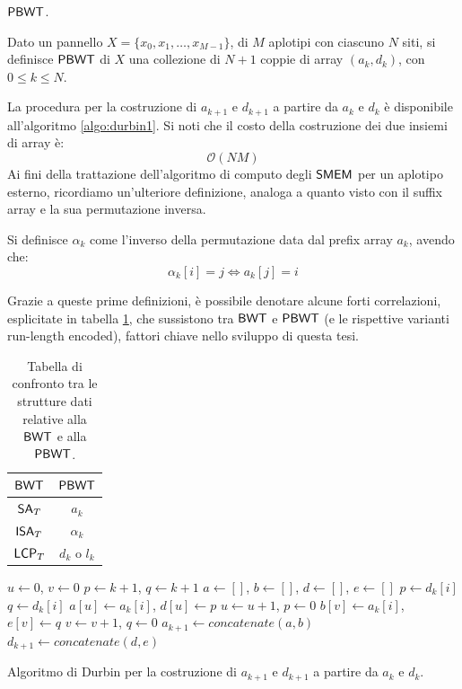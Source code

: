 $\mbox{\rm {\sf PBWT}}$.
\begin{definizione}
  Dato un pannello $X=\{x_0,x_1,\ldots,x_{M-1}\}$, di $M$ aplotipi con ciascuno
  $N$ siti, si definisce $\mbox{\rm {\sf PBWT}}$ di $X$ una
  collezione di $N+1$ coppie di array $(a_k,d_k)$, con $0\leq k\leq N$.
\end{definizione}
La procedura per la costruzione di $a_{k+1}$ e $d_{k+1}$ a partire da $a_k$ e
$d_k$ è disponibile all'algoritmo \ref{algo:durbin1}. Si noti che
il costo della costruzione dei due insiemi di array è:
\begin{equation}
  \label{eq:pbwtadtime}
  \mathcal{O}(\mathit{NM})
\end{equation}
Ai fini della trattazione dell'algoritmo di computo degli $\mbox{\rm {\sf SMEM}}$ per
un aplotipo esterno,
ricordiamo un'ulteriore definizione, analoga
a quanto visto con il suffix array e la sua permutazione inversa. 
\begin{definizione}
  Si definisce $\alpha_k$ come l'inverso della permutazione data dal
  prefix array $a_k$, avendo che:
  \[\alpha_k[i]=j \iff a_k[j]=i\]
\end{definizione}
Grazie a queste prime definizioni, è possibile denotare alcune forti
correlazioni, esplicitate in tabella \ref{tab:pbwtbwt}, che sussistono tra 
$\mbox{\rm {\sf BWT}}$ e $\mbox{\rm {\sf PBWT}}$ (e le rispettive varianti run-length
encoded), fattori chiave nello sviluppo di
questa tesi.
\begin{table}
  \centering
  \caption{Tabella di confronto tra le strutture dati relative alla $\mbox{\rm {\sf BWT}}$ e
    alla $\mbox{\rm {\sf PBWT}}$.}
  \label{tab:pbwtbwt}
  \vspace{-2mm}
  \begin{tabular}{c|c}
    $\mbox{\rm {\sf BWT}}$ & $\mbox{\rm {\sf PBWT}}$\\
    \hline
    $\mbox{\rm {\sf SA}}_T$ & $a_k$\\
    $\mbox{\rm {\sf ISA}}_T$ & $\alpha_k$\\
    $\mbox{\rm {\sf LCP}}_T$ & $d_k$ o $l_k$\\            
  \end{tabular}
  
\end{table}
\begin{algorithm}
  \small
  \begin{algorithmic}[1]
    \State $u\gets 0$, $v\gets 0$
    \State $p\gets k+1$, $q\gets k+1$
    \State $a\gets []$, $b\gets []$, $d\gets []$, $e\gets []$
    \State $p\gets d_k[i]$
    \EndIf
    \State $q\gets d_k[i]$
    \EndIf
    \State $a[u]\gets a_k[i]$, $d[u]\gets p$
    \State $u\gets u+1$, $p\gets 0$
    \Else
    \State $b[v]\gets a_k[i]$, $e[v]\gets q$
    \State $v\gets v+1$, $q\gets 0$
    \EndIf
    \EndFor
    \State $a_{k+1}\gets concatenate(a,b)$
    \State $d_{k+1}\gets concatenate(d,e)$ 
    \EndFunction
  \end{algorithmic}
  \caption{Algoritmo di Durbin per la costruzione di $a_{k+1}$ e $d_{k+1}$ a
  partire da $a_{k}$ e $d_{k}$.}
  \label{algo:durbin1}
\end{algorithm}
